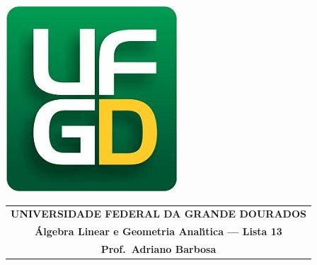 \documentclass[a4paper,5pt]{amsbook}
\begin{document}
\thispagestyle{empty}
\pagestyle{empty}
\begin{minipage}[h]{0.14\textwidth}
	\includegraphics[scale=0.24]{../../ufgd.png}
\end{minipage}
\begin{minipage}[h]{\textwidth}
\begin{tabular}{c}
{{\bf UNIVERSIDADE FEDERAL DA GRANDE DOURADOS}}\\
{{\bf \'{A}lgebra Linear e Geometria Anal\'{\i}tica --- Lista 13}}\\
{{\bf Prof.\ Adriano Barbosa}}\\
\end{tabular}
\vspace{-0.45cm}
%
\end{minipage}

\end{document}
